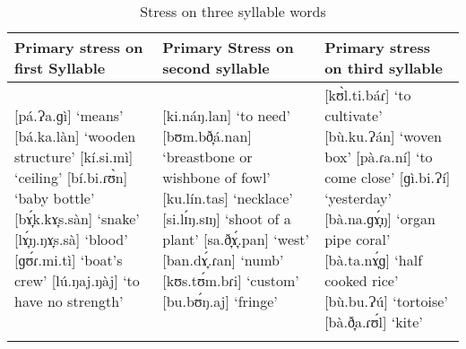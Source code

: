 \begin{table}
\caption{Stress on three syllable words}
\label{tab2.11}
\begin{tabularx}{\textwidth}{QQQ}
\lsptoprule
Primary stress on first
Syllable & Primary Stress on second syllable & Primary stress on third syllable \\
\midrule
{}[pá.Ɂa.ɡì] ‘means’
\newline
{}[bá.ka.làn] ‘wooden structure’ 
\newline
{}[kí.si.mì] ‘ceiling’
\newline
{}[bí.bi.ɾʊ̀n] ‘baby bottle’
\newline
{}[bɤ̞́k.kɤ̞s.sàn] ‘snake’
\newline
{}[lɤ̞́ŋ.ŋɤ̞s.sà] ‘blood’
\newline
{}[ɡʊ́ɾ.mi.tì] ‘boat’s crew’
\newline
{}[lú.ŋaj.ŋàj] ‘to have no strength’
& 
{}[ki.náŋ.lan] ‘to need’
\newline
{}[bʊm.bð̞á.nan] ‘breastbone or wishbone of fowl’
\newline
{}[ku.lín.tas] ‘necklace’
\newline
{}[si.lɪ́ŋ.sɪŋ] ‘shoot of a plant’
\newline
{}[sa.ð̞ɤ̞́.pan] ‘west’
\newline
{}[ban.dɤ̞́.ɾan] ‘numb’
\newline
{}[kʊs.tʊ́m.bɾi] ‘custom’
\newline
{}[bu.bʊ́ŋ.aj] ‘fringe’
&
{}[kʊ̀l.ti.báɾ] ‘to cultivate’
\newline
{}[bù.ku.Ɂán] ‘woven box’
\newline
{}[pà.ɾa.ní] ‘to come close’
\newline
{}[ɡì.bi.Ɂí] ‘yesterday’
\newline
{}[bà.na.ɡɤ̞́ŋ] ‘organ pipe coral’
\newline
{}[bà.ta.nɤ̞́ɡ] ‘half cooked rice’
\newline
{}[bù.bu.Ɂú] ‘tortoise’
\newline
{}[bà.ð̞a.ɾʊ́l] ‘kite’ \\
\lspbottomrule
\end{tabularx}
\end{table}

\newpage

